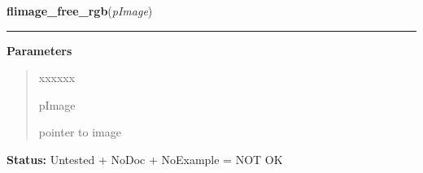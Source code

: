     \label{xformslib:library:flimage_free_rgb}

    \vspace{0.5ex}

\hspace{.8\funcindent}\begin{boxedminipage}{\funcwidth}

    \raggedright \textbf{flimage\_free\_rgb}(\textit{pImage})

    \vspace{-1.5ex}

    \rule{\textwidth}{0.5\fboxrule}
\setlength{\parskip}{2ex}
\setlength{\parskip}{1ex}
      \textbf{Parameters}
      \vspace{-1ex}

      \begin{quote}
        \begin{Ventry}{xxxxxx}

          \item[pImage]

          pointer to image

        \end{Ventry}

      \end{quote}

\textbf{Status:} Untested + NoDoc + NoExample = NOT OK



    \end{boxedminipage}

    \label{xformslib:library:flimage_freemem}

    \vspace{0.5ex}

